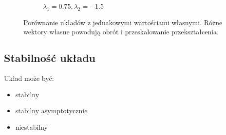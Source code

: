 \documentclass[]{article}
\begin{document}
\begin{figure}[H]
\begin{subfigure}{.5\textwidth}
		\caption{$\lambda_1 = 0.75, \lambda_2 = -1.5$}
		\label{fig:rotation2}
	\end{subfigure}
	\caption{Porównanie układów z jednakowymi wartościami własnymi. Różne wektory własne powodują obrót i przeskalowanie przekształcenia.}
	\label{fig1}
\end{figure}

\subsection{Stabilność układu}
Układ może być:
\begin{itemize}
	\item stabilny
	\item stabilny asymptotycznie\
	\item niestabilny
\end{itemize}
\end{document}
